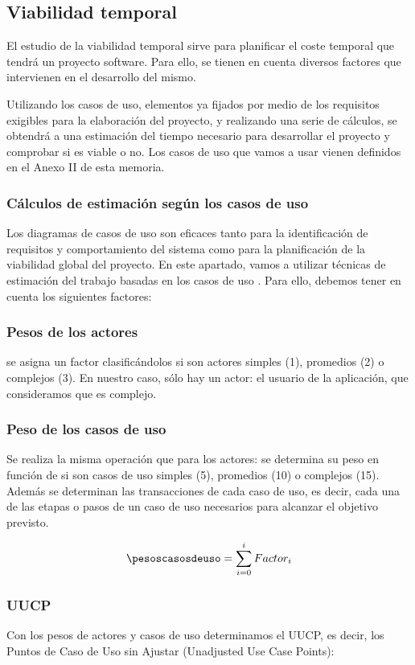 \subsection{Viabilidad temporal}
El estudio de la viabilidad temporal sirve para planificar el coste temporal que tendrá un proyecto software. Para ello, se tienen en cuenta diversos factores que intervienen en el desarrollo del mismo.

Utilizando los casos de uso, elementos ya fijados por medio de los requisitos exigibles para la elaboración del proyecto, y realizando una serie de cálculos, se obtendrá a una estimación del tiempo necesario para desarrollar el proyecto y comprobar si es viable o no. Los casos de uso que vamos a usar vienen definidos en el Anexo II de esta memoria.


\subsubsection{Cálculos de estimación según los casos de uso}
Los diagramas de casos de uso son eficaces tanto para la identificación de requisitos y comportamiento del sistema como para la planificación de la viabilidad global del proyecto. En este apartado, vamos a utilizar técnicas de estimación del trabajo basadas en los casos de uso \cite{wiki:casosuso}. Para ello, debemos tener en cuenta los siguientes factores:

\subsubsection*{Pesos de los actores}
se asigna un factor clasificándolos si son actores simples (1), promedios (2) o complejos (3). En nuestro caso, sólo hay un actor: el usuario de la aplicación, que consideramos que es complejo.

\subsubsection*{Peso de los casos de uso}
Se realiza la misma operación que para los actores: se determina su peso en función de si son casos de uso simples (5), promedios (10) o complejos (15). Además se determinan las transacciones de cada caso de uso, es decir, cada una de las etapas o pasos de un caso de uso necesarios para alcanzar el objetivo previsto.

\[ \pesoscasosdeuso = \sum_{i = 0}^{i} Factor_{i} \]

\subsubsection*{UUCP}
Con los pesos de actores y casos de uso determinamos el UUCP, es decir, los Puntos de Caso de Uso sin Ajustar (Unadjusted Use Case Points):

